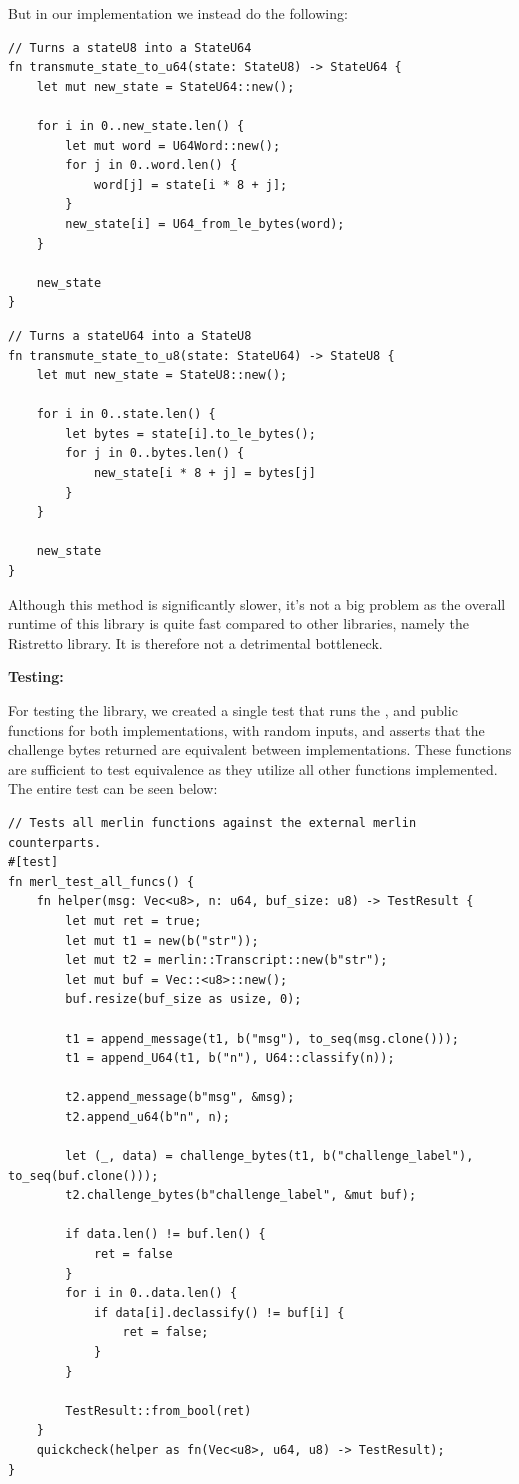 \documentclass{article}
\newcommand*\ttvar[1]{\texttt{\expandafter\dottvar\detokenize{#1}\relax}}
\newcommand*\dottvar[1]{\ifx\relax#1\else
  \expandafter\ifx\string_#1\string_\allowbreak\else#1\fi
  \expandafter\dottvar\fi}
\begin{document}
But in our implementation we instead do the following: 

\begin{lstlisting}
// Turns a stateU8 into a StateU64
fn transmute_state_to_u64(state: StateU8) -> StateU64 {
	let mut new_state = StateU64::new();

	for i in 0..new_state.len() {
		let mut word = U64Word::new();
		for j in 0..word.len() {
			word[j] = state[i * 8 + j];
		}
		new_state[i] = U64_from_le_bytes(word);
	}

	new_state
}
\end{lstlisting}
\begin{lstlisting}
// Turns a stateU64 into a StateU8
fn transmute_state_to_u8(state: StateU64) -> StateU8 {
	let mut new_state = StateU8::new();

	for i in 0..state.len() {
		let bytes = state[i].to_le_bytes();
		for j in 0..bytes.len() {
			new_state[i * 8 + j] = bytes[j]
		}
	}

	new_state
}
\end{lstlisting}

Although this method is significantly slower, it's not a big problem
as the overall runtime of this library is quite fast compared to other
libraries, namely the Ristretto library. It is therefore not a 
detrimental bottleneck.

\textbf{Testing:}

For testing the library, we created a single test that
runs the \ttvar{append_message()}, \ttvar{append_u64()} and
\ttvar{challenge_bytes()} public functions for both implementations,
with random inputs, and asserts that the challenge bytes returned are
equivalent between implementations. These functions are sufficient to
test equivalence as they utilize all other functions implemented. The
entire test can be seen below:

\begin{lstlisting}
// Tests all merlin functions against the external merlin counterparts.
#[test]
fn merl_test_all_funcs() {
	fn helper(msg: Vec<u8>, n: u64, buf_size: u8) -> TestResult {
		let mut ret = true;
		let mut t1 = new(b("str"));
		let mut t2 = merlin::Transcript::new(b"str");
		let mut buf = Vec::<u8>::new();
		buf.resize(buf_size as usize, 0);

		t1 = append_message(t1, b("msg"), to_seq(msg.clone()));
		t1 = append_U64(t1, b("n"), U64::classify(n));

		t2.append_message(b"msg", &msg);
		t2.append_u64(b"n", n);

		let (_, data) = challenge_bytes(t1, b("challenge_label"), to_seq(buf.clone()));
		t2.challenge_bytes(b"challenge_label", &mut buf);

		if data.len() != buf.len() {
			ret = false
		}
		for i in 0..data.len() {
			if data[i].declassify() != buf[i] {
				ret = false;
			}
		}

		TestResult::from_bool(ret)
	}
	quickcheck(helper as fn(Vec<u8>, u64, u8) -> TestResult);
}
\end{lstlisting}
\end{document}
